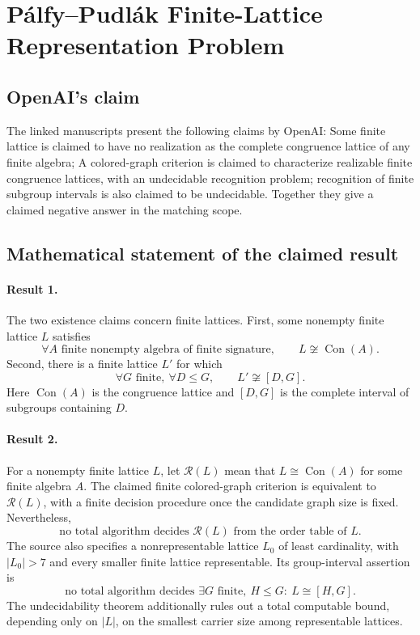\documentclass[11pt]{article}
\begin{document}
\section*{Pálfy–Pudlák Finite-Lattice Representation Problem}

\subsection{OpenAI's claim}
The linked manuscripts present the following claims by OpenAI: Some finite lattice is claimed to have no realization as the complete congruence lattice of any finite algebra; A colored-graph criterion is claimed to characterize realizable finite congruence lattices, with an undecidable recognition problem; recognition of finite subgroup intervals is also claimed to be undecidable. Together they give a claimed negative answer in the matching scope.

\subsection{Mathematical statement of the claimed result}
\paragraph{Result 1.} The two existence claims concern finite lattices. First, some nonempty finite lattice \(L\) satisfies
\[
 \forall A\text{ finite nonempty algebra of finite signature},\qquad
 L\not\cong\operatorname{Con}(A).
\]
Second, there is a finite lattice \(L'\) for which
\[
 \forall G\text{ finite},\ \forall D\le G,\qquad L'\not\cong[D,G].
\]
Here \(\operatorname{Con}(A)\) is the congruence lattice and \([D,G]\) is the complete interval of subgroups containing \(D\).

\paragraph{Result 2.} For a nonempty finite lattice \(L\), let \(\mathcal R(L)\) mean that \(L\cong\operatorname{Con}(A)\) for some finite algebra \(A\). The claimed finite colored-graph criterion is equivalent to \(\mathcal R(L)\), with a finite decision procedure once the candidate graph size is fixed. Nevertheless,
\[
 \text{no total algorithm decides }\mathcal R(L)\text{ from the order table of }L.
\]
The source also specifies a nonrepresentable lattice \(L_0\) of least cardinality, with \(|L_0|>7\) and every smaller finite lattice representable. Its group-interval assertion is
\[
 \text{no total algorithm decides }\exists G\text{ finite},\ H\le G:\ L\cong[H,G].
\]
The undecidability theorem additionally rules out a total computable bound, depending only on \(|L|\), on the smallest carrier size among representable lattices.
\end{document}
